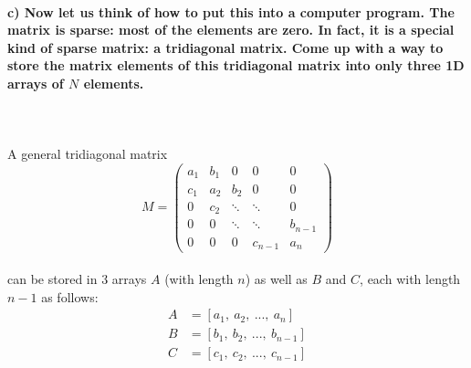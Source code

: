 \paragraph{
    c) Now let us think of how to put this into a computer program. The
    matrix is sparse: most of the elements are zero. In fact, it is a
    special kind of sparse matrix: a tridiagonal matrix. Come up with a
    way to store the matrix elements of this tridiagonal matrix into
    only three 1D arrays of $N$ elements.
} \ \\
    \\
    A general tridiagonal matrix
    \begin{equation}
        M=
        \begin{pmatrix}
            a_1 & b_1 & 0      & 0       & 0 \\
            c_1 & a_2 & b_2    & 0       & 0 \\
            0   & c_2 & \ddots & \ddots  & 0 \\
            0   & 0   & \ddots & \ddots  & b_{n-1} \\
            0   & 0   & 0      & c_{n-1} & a_n
        \end{pmatrix}
    \end{equation} \ \\
    can be stored in 3 arrays $A$ (with length $n$) as well as
    $B$ and $C$, each with length $n-1$ as follows:
    \begin{align}
        A&=[a_1,\ a_2,\ ...,\ a_n] \\
        B&=[b_1,\ b_2,\ ...,\ b_{n-1}] \\
        C&=[c_1,\ c_2,\ ...,\ c_{n-1}]
    \end{align}

\newpage
